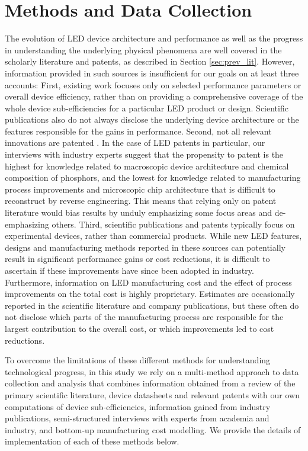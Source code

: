 \documentclass[journal=jacsat,manuscript=article]{achemso}
\begin{document}
\section{Methods and Data Collection}
\label{sec:methods}

The evolution of LED device architecture and performance as well as the progress in understanding the underlying physical phenomena are well covered in the scholarly literature and patents, as described in Section \ref{sec:prev_lit}. However, information provided in such sources is insufficient for our goals on at least three accounts: First, existing work focuses only on selected performance parameters or overall device efficiency, rather than on providing a comprehensive coverage of the whole device sub-efficiencies for a particular LED product or design. Scientific publications also do not always disclose the underlying device architecture or the features responsible for the gains in performance. Second, not all relevant innovations are patented \cite{Pakes_1980}\cite{ Fontana_2013}. In the case of LED patents in particular, our interviews with industry experts suggest that the propensity to patent is the highest for knowledge related to macroscopic device architecture and chemical composition of phosphors, and the lowest for knowledge related to manufacturing process improvements and microscopic chip architecture that is difficult to reconstruct by reverse engineering. This means that relying only on patent literature would bias results by unduly emphasizing some focus areas and de-emphasizing others. Third, scientific publications and patents typically focus on experimental devices, rather than commercial products. While new LED features, designs and manufacturing methods reported in these sources can potentially result in significant performance gains or cost reductions, it is difficult to ascertain if these improvements have since been adopted in industry.  Furthermore, information on LED manufacturing cost and the effect of process improvements on the total cost is highly proprietary. Estimates are occasionally reported in the scientific literature and company publications, but these often do not disclose which parts of the manufacturing process are responsible for the largest contribution to the overall cost, or which improvements led to cost reductions.

To overcome the limitations of these different methods for understanding technological progress, in this study we rely on a multi-method approach to data collection and analysis that combines information obtained from a review of the primary scientific literature, device datasheets and relevant patents with our own computations of device sub-efficiencies, information gained from industry publications, semi-structured interviews with experts from academia and industry, and bottom-up manufacturing cost modelling. We provide the details of implementation of each of these methods below.
\end{document}
